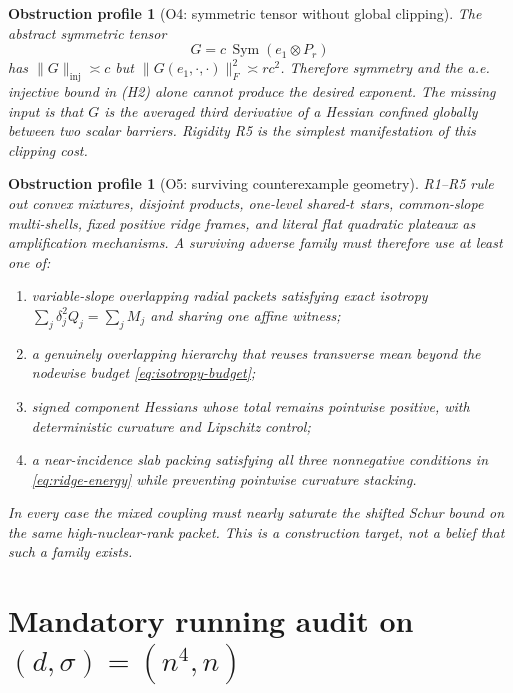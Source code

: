 \documentclass[11pt]{article}
\numberwithin{equation}{section}
\newtheorem{obstruction}[theorem]{Obstruction profile}
\DeclareMathOperator{\Sym}{Sym}
\newcommand{\inj}{\mathrm{inj}}
\begin{document}
\begin{obstruction}[O4: symmetric tensor without global clipping]
The abstract symmetric tensor
\begin{equation}\label{eq:O4}
 G=c\,\Sym(e_1\otimes P_r)
\end{equation}
has $\|G\|_{\inj}\asymp c$ but
$\|G(e_1,\cdot,\cdot)\|_F^2\asymp rc^2$.
Therefore symmetry and the a.e. injective bound in (H2) alone cannot produce
the desired exponent.  The missing input is that $G$ is the averaged third
derivative of a Hessian confined globally between two scalar barriers.
Rigidity R5 is the simplest manifestation of this clipping cost.
\end{obstruction}

\begin{obstruction}[O5: surviving counterexample geometry]
R1--R5 rule out convex mixtures, disjoint products, one-level shared-$t$
stars, common-slope multi-shells, fixed positive ridge frames, and literal
flat quadratic plateaux as amplification mechanisms.  A surviving adverse
family must therefore use at least one of:
\begin{enumerate}[label=(\alph*)]
 \item variable-slope overlapping radial packets satisfying exact isotropy
 $\sum_j\delta_j^2Q_j=\sum_jM_j$ and sharing one affine witness;
 \item a genuinely overlapping hierarchy that reuses transverse mean beyond
 the nodewise budget \eqref{eq:isotropy-budget};
 \item signed component Hessians whose total remains pointwise positive,
 with deterministic curvature and Lipschitz control;
 \item a near-incidence slab packing satisfying all three nonnegative
 conditions in \eqref{eq:ridge-energy} while preventing pointwise curvature
 stacking.
\end{enumerate}
In every case the mixed coupling must nearly saturate the shifted Schur
bound on the same high-nuclear-rank packet.  This is a construction target,
not a belief that such a family exists.
\end{obstruction}

\section{Mandatory running audit on
\texorpdfstring{$(d,\sigma)=(n^4,n)$}{(d,sigma)=(n4,n)}}
\label{sec:audit-family}
\end{document}
